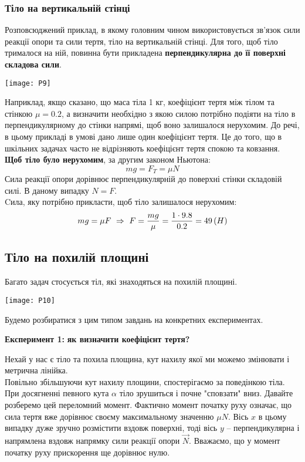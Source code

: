 \documentclass[a4paper,12pt]{article}
\begin{document}
\subsubsection{Тіло на вертикальній стінці}
Розповсюджений приклад, в якому головним чином використовується зв'язок сили реакції опори та сили тертя, тіло на вертикальній стінці. Для того, щоб тіло трималося на ній, повинна бути прикладена \textbf{перпендикулярна до її поверхні складова сили}. 
\begin{center}\texttt{[image: P9]}\end{center}
Наприклад, якщо сказано, що маса тіла 1 кг, коефіцієнт тертя між тілом та стінкою $\mu = 0.2$, а визначити необхідно з якою силою потрібно подіяти на тіло в перпендикулярному до стінки напрямі, щоб воно залишалося нерухомим. До речі, в цьому прикладі в умові дано лише один коефіцієнт тертя. Це до того, що в шкільних задачах часто не відрізняють коефіцієнт тертя спокою та ковзання. \\

\hspace{-0.65cm}\textbf{Щоб тіло було нерухомим}, за другим законом Ньютона: $$mg = F_T = \mu N$$ Сила реакції опори дорівнює перпендикулярній до поверхні стінки складовій силі. В даному випадку $N = F$.\\ 

Cила, яку потрібно прикласти, щоб тіло залишалося нерухомим:
$$mg = \mu F\,\,\Rightarrow\,\, F = \dfrac{mg}{\mu} = \dfrac{1\cdot 9.8}{0.2} = 49 \thinspace (H)$$ 
\newpage

\subsection{Тіло на похилій площині}
Багато задач стосується тіл, які знаходяться на похилій площині. 
\begin{center}\texttt{[image: P10]}\end{center}
Будемо розбиратися з цим типом завдань на конкретних експериментах. \\

\begin{center}\textcolor{EdErablue}{\textbf{Експеримент 1:}} \textbf{як визначити коефіцієнт тертя? } \end{center}
Нехай у нас є тіло та похила площина, кут нахилу якої ми можемо змінювати і метрична лінійка.\\

Повільно збільшуючи кут нахилу площини, спостерігаємо за поведінкою тіла. При досягненні певного кута $\alpha$ тіло зрушиться і почне "сповзати" \thinspace вниз. Давайте розберемо цей переломний момент. Фактично момент початку руху означає, що сила тертя вже дорівнює своєму максимальному значенню $\mu N$. Вісь $x$ в цьому випадку дуже зручно розмістити вздовж поверхні, тоді вісь $y$ – перпендикулярна і напрямлена вздовж напрямку сили реакції опори $\vec{N}$. Вважаємо, що у момент початку руху прискорення ще дорівнює нулю. \\
\end{document}
